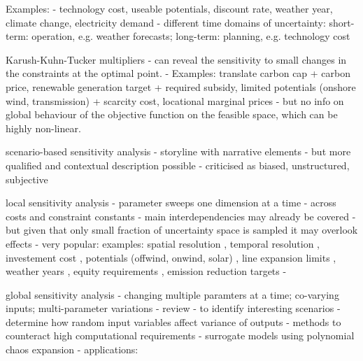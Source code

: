 
Examples:
- technology cost, useable potentials, discount rate, weather year, climate change, electricity demand
- different time domains of uncertainty: short-term: operation, e.g. weather forecasts; long-term: planning, e.g. technology cost

Karush-Kuhn-Tucker multipliers
- can reveal the sensitivity to small changes in the constraints at the optimal point.
- Examples: translate carbon cap + carbon price, renewable generation target + required subsidy, limited potentials (onshore wind, transmission) + scarcity cost, locational marginal prices
- but no info on global behaviour of the objective function on the feasible space, which can be highly non-linear.

scenario-based sensitivity analysis
- storyline with narrative elements \cite{DeCarolis2017}
- but more qualified and contextual description possible \cite{soroudi_decision_2013}
- criticised as biased, unstructured, subjective \cite{usher_value_2015}

local sensitivity analysis
- parameter sweeps one dimension at a time \cite{schlachtberger_cost_2018}
- across costs and constraint constants
- main interdependencies may already be covered \cite{schlachtberger_cost_2018}
- but given that only small fraction of uncertainty space is sampled it may overlook effects \cite{pizarro-alonso_uncertainties_2019}
- very popular: examples: spatial resolution \cite{hoersch_spatial_2017}, temporal resolution \cite{kotzur_tsa_2018}, investement cost \cite{shirizadeh_how_2019}, potentials (offwind, onwind, solar) \cite{schlachtberger_cost_2018}, line expansion limits \cite{schlachtberger_benefits_2017}, weather years \cite{bloomfield_2021}, equity requirements \cite{sasse_regional_2020,sasse_distributional_2019}, emission reduction targets
- \cite{schyska_sensitivity_2020}

global sensitivity analysis
- changing multiple paramters at a time; co-varying inputs; multi-parameter variations
- review \cite{iooss_review_2014}
- to identify interesting scenarios \cite{usher_value_2015}
- determine how random input variables affect variance of outputs \cite{sudret_global_2008}
- methods to counteract high computational requirements \cite{usher_value_2015} \cite{pizarro-alonso_uncertainties_2019} \cite{moret_robust_2016}
- surrogate models using polynomial chaos expansion \cite{trondle_trade-offs_2020}
- applications: \cite{fais_impact_2016,mavromatidis_uncertainty_2018,pilpola_analyzing_2020}

